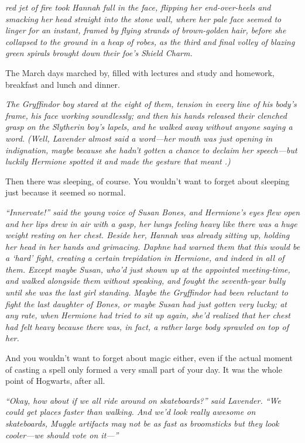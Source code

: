 
 \emph{red jet
of fire took Hannah full in the face, flipping her end-over-heels and smacking
her head straight into the stone wall, where her pale face seemed to linger for
an instant, framed by flying strands of brown-golden hair, before she collapsed
to the ground in a heap of robes, as the third and final volley of blazing
green spirals brought down their foe's Shield Charm.}

The March days marched by, filled with lectures and study and homework,
breakfast and lunch and dinner.

\emph{The Gryffindor boy stared at the eight of them, tension in every line of
his body's frame, his face working soundlessly; and then his hands released
their clenched grasp on the Slytherin boy's lapels, and he walked away without
anyone saying a word. (Well, Lavender almost said a word---her mouth was just
opening in indignation, maybe because she hadn't gotten a chance to declaim her
speech---but luckily Hermione spotted it and made the gesture that meant .)}

Then there was sleeping, of course. You wouldn't want to forget about sleeping
just because it seemed so normal.

\emph{``Innervate!'' said the young voice of Susan Bones, and Hermione's eyes
flew open and her lips drew in air with a gasp, her lungs feeling heavy like
there was a huge weight resting on her chest. Beside her, Hannah was already
sitting up, holding her head in her hands and grimacing. Daphne had warned them
that this would be a `hard' fight, creating a certain trepidation in Hermione,
and indeed in all of them. Except maybe Susan, who'd just shown up at the
appointed meeting-time, and walked alongside them without speaking, and fought
the seventh-year bully until she was the last girl standing. Maybe the
Gryffindor had been reluctant to fight the last daughter of Bones, or maybe
Susan had just gotten very lucky; at any rate, when Hermione had tried to sit
up again, she'd realized that her chest had felt heavy because there was, in
fact, a rather large body sprawled on top of her.}

And you wouldn't want to forget about magic either, even if the actual moment
of casting a spell only formed a very small part of your day. It was the whole
point of Hogwarts, after all.

\emph{``Okay, how about if we all ride around on skateboards?'' said Lavender.
``We could get places faster than walking. And we'd look really awesome on
skateboards, Muggle artifacts may not be as fast as broomsticks but they look
cooler---we should vote on it---''}

